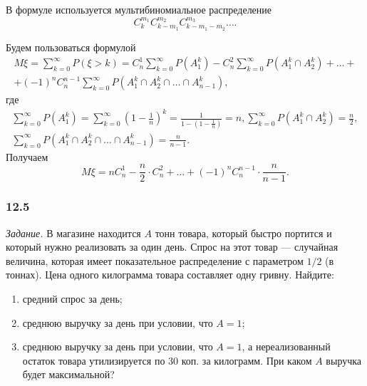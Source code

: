 В формуле используется мультибиномиальное распределение
$$C_k^{m_1} C_{k-m_1}^{m_2} C_{k- m_1 - m_2}^{m_3} \dotsc.$$

Будем пользоваться формулой
\begin{equation*}
\begin{split}
M \xi =
\sum \limits_{k=0}^{ \infty } P \left( \xi > k \right) =
C_n^1 \sum \limits_{k=0}^{ \infty } P \left( A_1^k \right) -
C_n^2 \sum \limits_{k=0}^{ \infty } P \left( A_1^k \cap A_2^k \right) +
\dotsc + \\
+ \left( -1 \right)^n C_n^{n-1} \sum \limits_{k=0}^{ \infty } P \left( A_1^k \cap A_2^k \cap \dotsc \cap A_{n-1}^k \right),
\end{split}
\end{equation*}
где
\begin{equation*}
\begin{split}
\sum \limits_{k=0}^{ \infty } P \left( A_1^k \right) =
\sum \limits_{k=0}^{ \infty } \left( 1 - \frac{1}{n} \right)^k =
\frac{1}{1 - \left( 1 - \frac{1}{n} \right) } =
n,
\sum \limits_{k=0}^{ \infty } P \left( A_1^k \cap A_2^k \right) =
\frac{n}{2}, \\
\sum \limits_{k=0}^{ \infty } P \left( A_1^k \cap A_2^k \cap \dotsc \cap A_{n-1}^k \right) =
\frac{n}{n-1}.
\end{split}
\end{equation*}
Получаем
$$M \xi =
nC_n^1 - \frac{n}{2} \cdot C_n^2 + \dotsc + \left( -1 \right)^n C_n^{n-1} \cdot \frac{n}{n-1}.$$

\subsubsection*{12.5}

\textit{Задание.} В магазине находится $A$ тонн товара, который быстро портится и который нужно реализовать за один день.
Спрос на этот товар --- случайная величина, которая имеет показательное распределение с параметром $1/2$ (в тоннах).
Цена одного килограмма товара составляет одну гривну.
Найдите:
\begin{enumerate}[label=\alph*)]
\item средний спрос за день;
\item среднюю выручку за день при условии, что $A = 1$;
\item среднюю выручку за день при условии, что $A = 1$, а нереализованный остаток товара утилизируется по 30 коп. за килограмм.
При каком $A$ выручка будет максимальной?
\end{enumerate}

